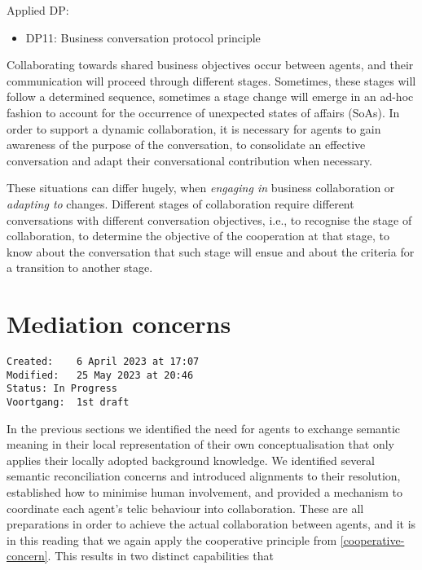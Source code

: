 \documentclass[sort&compress,preprint,3p,authoryear,twocolumn]{elsarticle}
\providecommand{\tightlist}{%
  \setlength{\itemsep}{0pt}\setlength{\parskip}{0pt}}
\theoremstyle{break}			%
\begin{document}
Applied DP:

\begin{itemize}
\tightlist
\item
  DP11: Business conversation protocol principle
\end{itemize}

Collaborating towards shared business objectives occur between agents,
and their communication will proceed through different stages.
Sometimes, these stages will follow a determined sequence, sometimes a
stage change will emerge in an ad-hoc fashion to account for the
occurrence of unexpected states of affairs (SoAs). In order to support a
dynamic collaboration, it is necessary for agents to gain awareness of
the purpose of the conversation, to consolidate an effective
conversation and adapt their conversational contribution when necessary.

These situations can differ hugely, when \emph{engaging in} business
collaboration or \emph{adapting to} changes. Different stages of
collaboration require different conversations with different
conversation objectives, i.e., to recognise the stage of collaboration,
to determine the objective of the cooperation at that stage, to know
about the conversation that such stage will ensue and about the criteria
for a transition to another stage.

\section{Mediation concerns}\label{mediation-concerns}

\begin{verbatim}
Created:    6 April 2023 at 17:07
Modified:   25 May 2023 at 20:46
Status: In Progress
Voortgang:  1st draft
\end{verbatim}

In the previous sections we identified the need for agents to exchange
semantic meaning in their local representation of their own
conceptualisation that only applies their locally adopted background
knowledge. We identified several semantic reconciliation concerns and
introduced alignments to their resolution, established how to minimise
human involvement, and provided a mechanism to coordinate each agent's
telic behaviour into collaboration. These are all preparations in order
to achieve the actual collaboration between agents, and it is in this
reading that we again apply the cooperative principle from
\cref{cooperative-concern}. This results in two distinct capabilities
that
\end{document}
